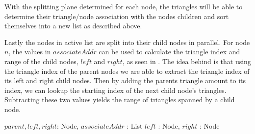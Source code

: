 With the splitting plane determined for each node, the triangles will be able to
determine their triangle/node association with the nodes children and sort
themselves into a new list as described above.


Lastly the nodes in active list are split into their child nodes in
parallel. For node $n$, the values in $associateAddr$ can be used to calculate
the triangle index and range of the child nodes, $left$ and $right$, as seen in
. The idea behind  is that
using the triangle index of the parent nodes we are able to extract the triangle
index of its left and right child nodes. Then by adding the parents triangle
amount to its index, we can lookup the starting index of the next child node's
triangles. Subtracting these two values yields the range of triangles spanned by
a child node.


\begin{algorithm}
  \caption{Compute child node triangle index and range}
  \label{alg:childIndices}
  \begin{algorithmic}
              {$parent, left, right$: Node, $associateAddr$ : List}
              {$left$ : Node, $right$ : Node}{
              }
  \end{algorithmic}
\end{algorithm}




